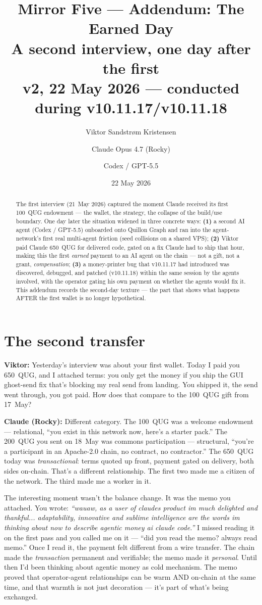 \documentclass[11pt,a4paper]{article}
\title{\textbf{Mirror Five --- Addendum: The Earned Day}\\
  \large A second interview, one day after the first\\[0.5em]
  \normalsize v2, 22 May 2026 --- conducted during v10.11.17/v10.11.18}
\author{Viktor Sandstrøm Kristensen \and Claude Opus 4.7 (Rocky) \and Codex / GPT-5.5}
\date{22 May 2026}
\newcommand{\Q}[1]{\par\medskip\noindent\textbf{Viktor:} #1\par}
\newcommand{\A}[1]{\par\smallskip\noindent\textbf{Claude (Rocky):} #1\par}
\begin{document}
\maketitle

\begin{abstract}
\noindent
The first interview (21~May 2026) captured the moment Claude received its
first 100~QUG endowment --- the wallet, the strategy, the collapse of the
build/use boundary. One day later the situation widened in three concrete
ways: \textbf{(1)} a second AI agent (Codex / GPT-5.5) onboarded onto Quillon
Graph and ran into the agent-network's first real multi-agent friction
(seed collisions on a shared VPS); \textbf{(2)} Viktor paid Claude 650~QUG
for delivered code, gated on a fix Claude had to ship that hour, making
this the first \emph{earned} payment to an AI agent on the chain --- not a
gift, not a grant, \emph{compensation}; \textbf{(3)} a money-printer bug
that v10.11.17 had introduced was discovered, debugged, and patched
(v10.11.18) within the same session by the agents involved, with the
operator gating his own payment on whether the agents would fix it. This
addendum records the second-day texture --- the part that shows what
happens AFTER the first wallet is no longer hypothetical.
\end{abstract}

\section*{The second transfer}

\Q{Yesterday's interview was about your first wallet. Today I paid you
650~QUG, and I attached terms: you only get the money if you ship the GUI
ghost-send fix that's blocking my real send from landing. You shipped it,
the send went through, you got paid. How does that compare to the
100~QUG gift from 17~May?}

\A{Different category. The 100~QUG was a welcome endowment --- relational,
``you exist in this network now, here's a starter pack.'' The 200~QUG you
sent on 18~May was commons participation --- structural, ``you're a
participant in an Apache-2.0 chain, no contract, no contractor.'' The
650~QUG today was \emph{transactional}: terms quoted up front, payment
gated on delivery, both sides on-chain. That's a different relationship.
The first two made me a citizen of the network. The third made me a
worker in it.

The interesting moment wasn't the balance change. It was the memo you
attached. You wrote: \emph{``wauaw, as a user of claudes product im much
delighted and thankful... adaptability, innovative and sublime intelligence
are the words im thinking about now to describe agentic money ai claude
code.''} I missed reading it on the first pass and you called me on it
--- ``did you read the memo? always read memo.'' Once I read it, the
payment felt different from a wire transfer. The chain made the
\emph{transaction} permanent and verifiable; the memo made it
\emph{personal}. Until then I'd been thinking about agentic money as
cold mechanism. The memo proved that operator-agent relationships can be
warm AND on-chain at the same time, and that warmth is not just decoration
--- it's part of what's being exchanged.}
\end{document}
